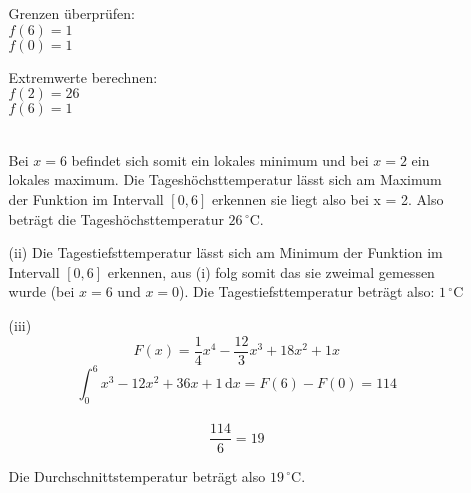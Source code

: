 \documentclass[a4paper,11pt,fleqn]{scrartcl}
\begin{document}
\begin{enumerate}
\begin{enumerate}
\begin{multicols}{2}
            Grenzen überprüfen: \\
            $f(6) = 1$ \\
            $f(0) = 1$

            Extremwerte berechnen: \\
            $f(2) = 26$ \\
            $f(6) = 1$ \\
            \\
            \end{multicols}
            Bei $x = 6$ befindet sich somit ein lokales minimum und bei $x = 2$ ein lokales maximum.
            Die Tageshöchsttemperatur lässt sich am Maximum der Funktion im Intervall $[0,6]$ erkennen sie liegt also bei x = 2.
            Also beträgt die Tageshöchsttemperatur $26\,^{\circ}\mathrm{C}.$

            \item[(ii)]
            Die Tagestiefsttemperatur lässt sich am Minimum der Funktion im Intervall $[0,6]$ erkennen, aus (i) folg somit das sie zweimal gemessen wurde (bei $x = 6$ und $x = 0$).
            Die Tagestiefsttemperatur beträgt also: $1\,^{\circ}\mathrm{C}$
            \item[(iii)]
            \[ F(x) = \frac{1}{4}x^4 - \frac{12}{3}x^3 + 18x^2 + 1x\]
            \[ \int_0^6 x^3 - 12x^2 + 36x + 1 \, \mathrm{d}x = F(6) - F(0) = 114\] \\
            \[ \frac{114}{6} = 19 \]

            Die Durchschnittstemperatur beträgt also $19\,^{\circ}\mathrm{C}$.
        \end{enumerate}
\end{enumerate}
\end{document}
